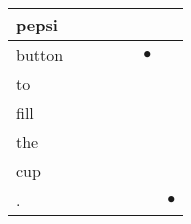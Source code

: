 \documentclass[landscape]{article}
\newcommand{\ssp}{\hspace{2pt}}
\newcommand{\mex}{\cellcolor{g}$\bullet$}
\begin{document}
\begin{tabular}{|l|p{10pt}|p{10pt}|p{10pt}|p{10pt}|p{10pt}|p{10pt}|}
\hline
\ssp pepsi \ssp&\hspace{2pt}&\hspace{2pt}&\hspace{2pt}&\hspace{2pt}&\hspace{2pt}&\hspace{2pt}\\
\hline
\ssp \cellcolor{ref4}button \ssp&\hspace{2pt}&\hspace{2pt}&\hspace{2pt}&\hspace{2pt}&\hspace{2pt}\mex&\hspace{2pt}\\
\hline
\ssp to \ssp&\hspace{2pt}&\hspace{2pt}&\hspace{2pt}&\hspace{2pt}&\hspace{2pt}&\hspace{2pt}\\
\hline
\ssp fill \ssp&\hspace{2pt}&\hspace{2pt}&\hspace{2pt}&\hspace{2pt}&\hspace{2pt}&\hspace{2pt}\\
\hline
\ssp the \ssp&\hspace{2pt}&\hspace{2pt}&\hspace{2pt}&\hspace{2pt}&\hspace{2pt}&\hspace{2pt}\\
\hline
\ssp cup \ssp&\hspace{2pt}&\hspace{2pt}&\hspace{2pt}&\hspace{2pt}&\hspace{2pt}&\hspace{2pt}\\
\hline
\ssp \cellcolor{ref5}. \ssp&\hspace{2pt}&\hspace{2pt}&\hspace{2pt}&\hspace{2pt}&\hspace{2pt}&\hspace{2pt}\mex\\
\hline
\end{tabular}
\end{document}
